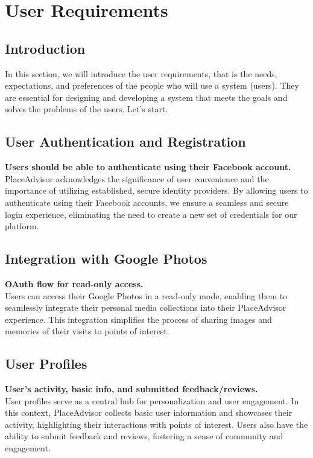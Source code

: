 \documentclass[../main.tex]{subfiles}
\begin{document}
\section{User Requirements}\label{sec:userrequirements}

\subsection{Introduction}
In this section, we will introduce the user requirements, that is the needs, expectations, and preferences of the people who will use a system (users). They are essential for designing and developing a system that meets the goals and solves the problems of the users. Let's start.

\subsection{User Authentication and Registration}
\textbf{Users should be able to authenticate using their Facebook account.}\\
PlaceAdvisor acknowledges the significance of user convenience and the importance of utilizing established, secure identity providers. By allowing users to authenticate using their Facebook accounts, we ensure a seamless and secure login experience, eliminating the need to create a new set of credentials for our platform.

\subsection{Integration with Google Photos}
\textbf{OAuth flow for read-only access.}\\
Users can access their Google Photos in a read-only mode, enabling them to seamlessly integrate their personal media collections into their PlaceAdvisor experience. This integration simplifies the process of sharing images and memories of their visits to points of interest.

\subsection{User Profiles}
\textbf{User's activity, basic info, and submitted feedback/reviews.}\\
User profiles serve as a central hub for personalization and user engagement. In this context, PlaceAdvisor collects basic user information and showcases their activity, highlighting their interactions with points of interest. Users also have the ability to submit feedback and reviews, fostering a sense of community and engagement.
\end{document}
